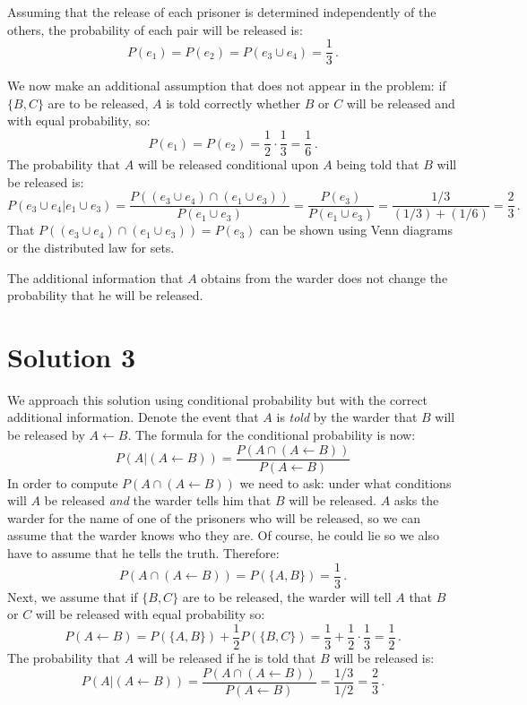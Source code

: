 \documentclass[11pt,a4paper]{article}
\begin{document}
Assuming that the release of each prisoner is determined independently of the others, the probability of each pair will be released is:
\[
P(e_1)=P(e_2)=P(e_3\cup e_4)=\frac{1}{3}\,.
\]

We now make an additional assumption that does not appear in the problem: if $\{B,C\}$ are to be released, $A$ is told correctly whether $B$ or $C$ will be released and with equal probability, so:
\[
P(e_1)=P(e_2)=\frac{1}{2}\cdot \frac{1}{3}=\frac{1}{6}\,.
\]
The probability that $A$ will be released conditional upon $A$ being told that $B$ will be released is:
\[
P(e_3\cup e_4|e_1\cup e_3) = \frac{P((e_3\cup e_4)\cap(e_1\cup e_3))}{P(e_1\cup e_3)}=\frac{P(e_3)}{P(e_1\cup e_3)}=\frac{1/3}{(1/3)+(1/6)}=\frac{2}{3}\,.
\]
That $P((e_3\cup e_4)\cap(e_1\cup e_3))=P(e_3)$ can be shown using Venn diagrams or the distributed law for sets.

The additional information that $A$ obtains from the warder does not change the probability that he will be released.


\section{Solution 3}

We approach this solution using conditional probability but with the correct additional information. Denote the event that $A$ is \emph{told} by the warder that $B$ will be released by $A\leftarrow B$. The formula for the conditional probability is now:
\[
P(A|(A\leftarrow B))=\frac{P(A\cap (A\leftarrow B))}{P(A\leftarrow B)}
\]
In order to compute $P(A\cap (A\leftarrow B))$ we need to ask: under what conditions will $A$  be released \emph{and} the warder tells him that $B$ will be released. $A$ asks the warder for the name of one of the prisoners who will be released, so we can assume that the warder knows who they are. Of course, he could lie so we also have to assume that he tells the truth. Therefore:
\[
P(A\cap (A\leftarrow B))=P(\{A,B\})=\frac{1}{3}\,.
\]
Next, we assume that if $\{B,C\}$ are to be released, the warder will tell $A$ that $B$ or $C$ will be released with equal probability so:
\[
P(A\leftarrow B)=P(\{A,B\})+\frac{1}{2} P(\{B,C\})=\frac{1}{3}+\frac{1}{2}\cdot\frac{1}{3}=\frac{1}{2}\,.
\]
The probability that $A$ will be released if he is told that $B$ will be released is:
\[
P(A|(A\leftarrow B)) =\frac{P(A\cap (A\leftarrow B))}{P(A\leftarrow B)} = \frac{1/3}{1/2}=\frac{2}{3}\,.
\]
\end{document}
